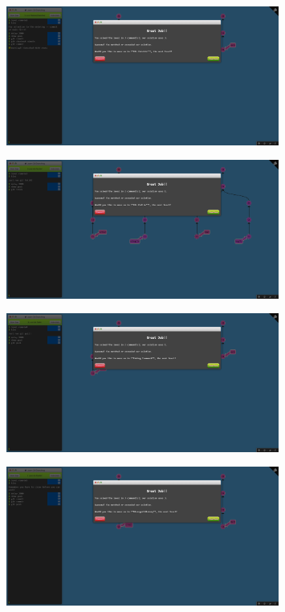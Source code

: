 \documentclass[a4paper]{article}
\begin{document}
\begin{figure}[H]
    \centering
    \includegraphics[width=0.8\textwidth]{16.png}
\end{figure}
\begin{figure}[H]
    \centering
    \includegraphics[width=0.8\textwidth]{17.png}
\end{figure}
\begin{figure}[H]
    \centering
    \includegraphics[width=0.8\textwidth]{18.png}
\end{figure}
\begin{figure}[H]
    \centering
    \includegraphics[width=0.8\textwidth]{19.png}
\end{figure}
\end{document}
